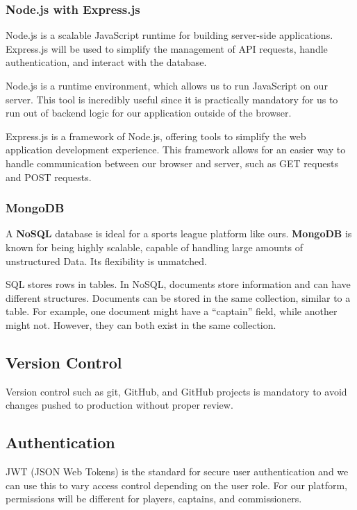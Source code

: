 \documentclass{article}
\begin{document}
\subsubsection*{Node.js with Express.js}
Node.js is a scalable JavaScript runtime for building server-side applications. Express.js will be used to simplify the management of API requests, handle authentication, and interact with the database.

Node.js is a runtime environment, which allows us to run JavaScript on our server. This tool is incredibly useful since it is practically mandatory for us to run out of backend logic for our application outside of the browser.

Express.js is a framework of Node.js, offering tools to simplify the web application development experience. This framework allows for an easier way to handle communication between our browser and server, such as GET requests and POST requests.

\subsubsection*{MongoDB}
A \textbf{NoSQL} database is ideal for a sports league platform like ours. \textbf{MongoDB} is known for being highly scalable, capable of handling large amounts of unstructured Data. Its flexibility is unmatched.

SQL stores rows in tables. In NoSQL, documents store information and can have different structures. Documents can be stored in the same collection, similar to a table. For example, one document might have a ``captain'' field, while another might not. However, they can both exist in the same collection.

\subsection{Version Control}
Version control such as git, GitHub, and GitHub projects is mandatory to avoid changes pushed to production without proper review.

\subsection{Authentication}
JWT (JSON Web Tokens) is the standard for secure user authentication and we can use this to vary access control depending on the user role. For our platform, permissions will be different for players, captains, and commissioners.
\end{document}
